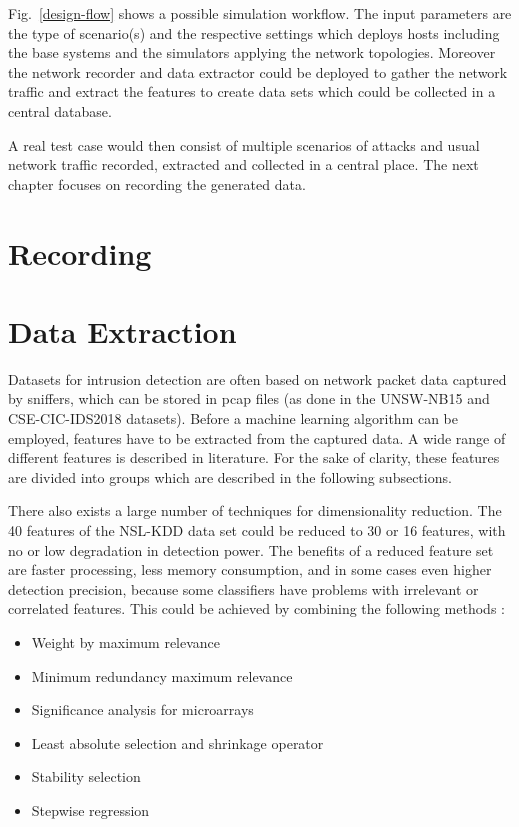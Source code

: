 \documentclass[conference]{IEEEtran}
\begin{document}
Fig.~\ref{design-flow} shows a possible simulation workflow. The input parameters are the type of scenario(s) and the respective settings which deploys hosts including the base systems and the simulators applying the network topologies. Moreover the network recorder and data extractor could be deployed to gather the network traffic and extract the features to create data sets which could be collected in a central database.

A real test case would then consist of multiple scenarios of attacks and usual network traffic recorded, extracted and collected in a central place. The next chapter focuses on recording the generated data.

\section{Recording}

\section{Data Extraction}

Datasets for intrusion detection are often based on network packet data captured by sniffers, which can be stored in pcap files (as done in the UNSW-NB15 \cite{Nb2015} and CSE-CIC-IDS2018 \cite{Ids2018} datasets). Before a machine learning algorithm can be employed, features have to be extracted from the captured data. A wide range of different features is described in literature. For the sake of clarity, these features are divided into groups which are described in the following subsections.

There also exists a large number of techniques for dimensionality reduction. The 40 features of the NSL-KDD data set could be reduced to 30 or 16 features, with no or low degradation in detection power. The benefits of a reduced feature set are faster processing, less memory consumption, and in some cases even higher detection precision, because some classifiers have problems with irrelevant or correlated features. This could be achieved by combining the following methods \cite{vasquez2015}:
\begin{itemize}
	\item Weight by maximum relevance
	\item Minimum redundancy maximum relevance
	\item Significance analysis for microarrays
	\item Least absolute selection and shrinkage operator
	\item Stability selection
	\item Stepwise regression
\end{itemize}
\end{document}
